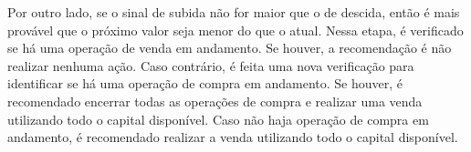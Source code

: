 Por outro lado, se o sinal de subida não for maior que o de descida, então é mais provável que o próximo valor seja menor do que o atual. Nessa etapa, é verificado se há uma operação de venda em andamento. Se houver, a recomendação é não realizar nenhuma ação. Caso contrário, é feita uma nova verificação para identificar se há uma operação de compra em andamento. Se houver, é recomendado encerrar todas as operações de compra e realizar uma venda utilizando todo o capital disponível. Caso não haja operação de compra em andamento, é recomendado realizar a venda utilizando todo o capital disponível. 





